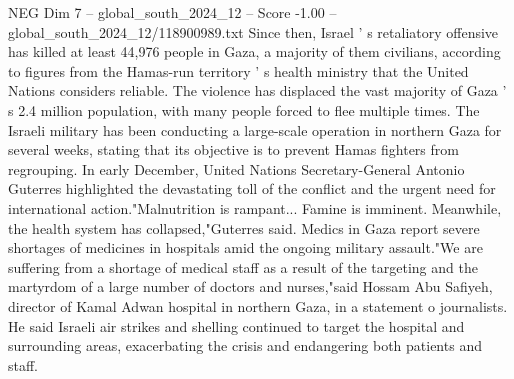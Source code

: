 \begin{textsample}{NEG Dim 7 – global\_south\_2024\_12 – Score -1.00 – global\_south\_2024\_12/118900989.txt}
Since then, Israel ' s retaliatory offensive has killed at least 44,976 people in Gaza, a majority of them civilians, according to figures from the Hamas-run territory ' s health ministry that the United Nations considers reliable.
The violence has displaced the vast majority of Gaza ' s 2.4 million population, with many people forced to flee multiple times.
The Israeli military has been conducting a large-scale operation in northern Gaza for several weeks, stating that its objective is to prevent Hamas fighters from regrouping.
In early December, United Nations Secretary-General Antonio Guterres highlighted the devastating toll of the conflict and the urgent need for international action."Malnutrition is rampant...
Famine is imminent.
Meanwhile, the health system has collapsed,"Guterres said.
Medics in Gaza report severe shortages of medicines in hospitals amid the ongoing military assault."We are suffering from a shortage of medical staff as a result of the targeting and the martyrdom of a large number of doctors and nurses,"said Hossam Abu Safiyeh, director of Kamal Adwan hospital in northern Gaza, in a statement o journalists.
He said Israeli air strikes and shelling continued to target the hospital and surrounding areas, exacerbating the crisis and endangering both patients and staff.

\end{textsample}
